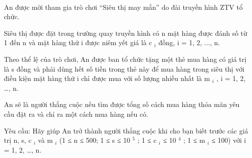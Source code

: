  

An được mời tham gia trò chơi “Siêu thị may mắn” do đài truyền hình ZTV tổ chức.

Siêu thị được đặt trong trường quay truyền hình có n mặt hàng được đánh số từ 1 đến n và mặt hàng thứ i được niêm yết giá là c $_ i $ đồng, i = 1, 2, ..., n.

Theo thể lệ của trò chơi, An được ban tổ chức tặng một thẻ mua hàng có giá trị là s đồng và phải dùng hết số tiền trong thẻ này để mua hàng trong siêu thị với điều kiện mặt hàng thứ i chỉ được mua với số lượng nhiều nhất là m $_ i $ , i = 1, 2, …, n.

An sẽ là người thắng cuộc nếu tìm được tổng số cách mua hàng thỏa mãn yêu cầu đặt ra và chỉ ra một cách mua hàng nếu có.

Yêu cầu: Hãy giúp An trở thành người thắng cuộc khi cho bạn biết trước các giá trị n, s, c $_ i $ và m $_ i $ (1 ≤ n ≤ 500; 1 ≤ s ≤ 10 $^ 5 $ ; 1 ≤ c $_ i $ ≤ 10 $^ 4 $ ; 1 ≤ m $_ i $ ≤ 100) với i = 1, 2, …, n.

\